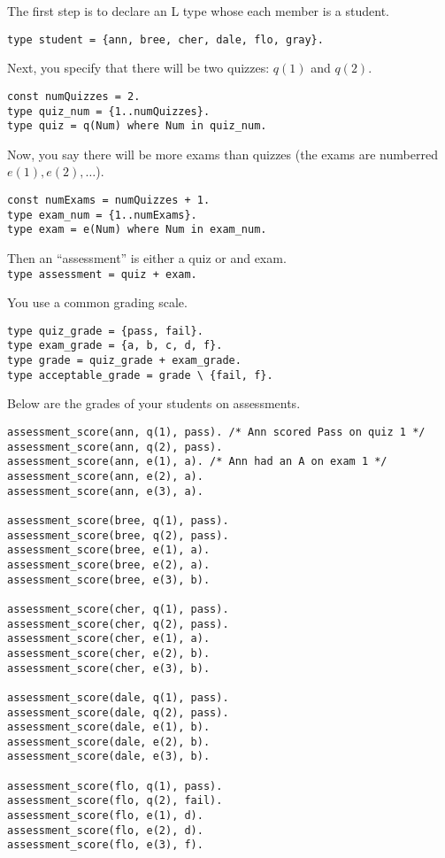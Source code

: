 \documentclass[letterpaper,10pt]{article}
\begin{document}
\begin{flushleft}
The first step is to declare an L type whose each member is a student.
\begin{verbatim}
type student = {ann, bree, cher, dale, flo, gray}. 
\end{verbatim}

Next, you specify that there will be two quizzes: $q(1)$ and $q(2)$.
\begin{verbatim}
const numQuizzes = 2.
type quiz_num = {1..numQuizzes}. 
type quiz = q(Num) where Num in quiz_num. 
\end{verbatim}

Now, you say there will be more exams than quizzes (the exams are numberred $e(1), e(2), \ldots$).
\begin{verbatim}
const numExams = numQuizzes + 1.
type exam_num = {1..numExams}.
type exam = e(Num) where Num in exam_num.
\end{verbatim}

Then an ``assessment'' is either a quiz or and exam.\\
\texttt{type assessment = quiz + exam.}

You use a common grading scale.
\begin{verbatim}
type quiz_grade = {pass, fail}.
type exam_grade = {a, b, c, d, f}.
type grade = quiz_grade + exam_grade.
type acceptable_grade = grade \ {fail, f}.
\end{verbatim}

\pagebreak


Below are the grades of your students on assessments.
\begin{verbatim}
assessment_score(ann, q(1), pass). /* Ann scored Pass on quiz 1 */
assessment_score(ann, q(2), pass). 
assessment_score(ann, e(1), a). /* Ann had an A on exam 1 */
assessment_score(ann, e(2), a). 
assessment_score(ann, e(3), a). 

assessment_score(bree, q(1), pass). 
assessment_score(bree, q(2), pass). 
assessment_score(bree, e(1), a). 
assessment_score(bree, e(2), a).
assessment_score(bree, e(3), b). 

assessment_score(cher, q(1), pass). 
assessment_score(cher, q(2), pass). 
assessment_score(cher, e(1), a). 
assessment_score(cher, e(2), b). 
assessment_score(cher, e(3), b).

assessment_score(dale, q(1), pass). 
assessment_score(dale, q(2), pass). 
assessment_score(dale, e(1), b). 
assessment_score(dale, e(2), b).
assessment_score(dale, e(3), b).

assessment_score(flo, q(1), pass). 
assessment_score(flo, q(2), fail). 
assessment_score(flo, e(1), d). 
assessment_score(flo, e(2), d).
assessment_score(flo, e(3), f). 


\end{verbatim}
\end{flushleft}
\end{document}
